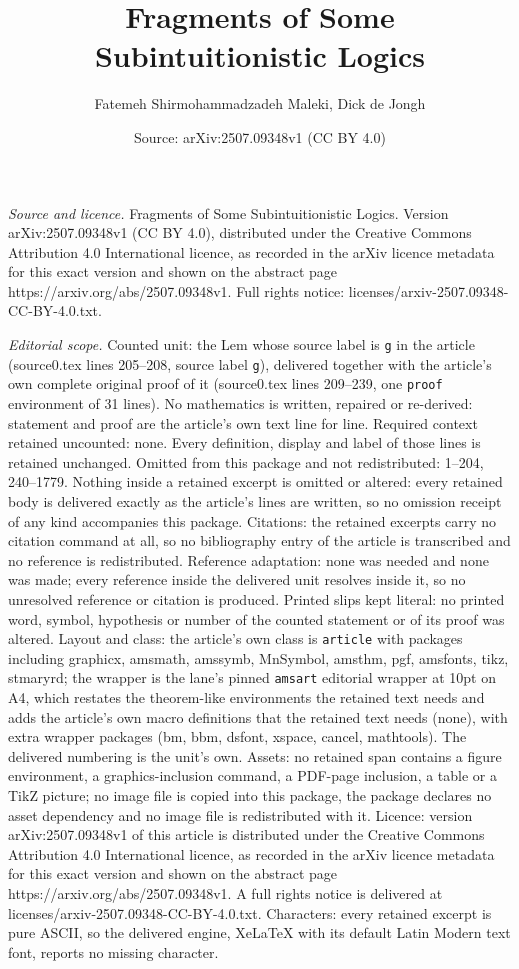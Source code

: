 \documentclass[10pt,a4paper]{amsart}
\title[Fragments of Some Subintuitionistic Logics]{Fragments of Some Subintuitionistic Logics}
\author{Fatemeh Shirmohammadzadeh Maleki, Dick de Jongh}
\date{Source: arXiv:2507.09348v1 (CC BY 4.0)}
\begin{document}
\maketitle

\noindent\emph{Source and licence.} Fragments of Some Subintuitionistic Logics. Version arXiv:2507.09348v1 (CC BY 4.0), distributed under the Creative Commons Attribution 4.0 International licence, as recorded in the arXiv licence metadata for this exact version and shown on the abstract page https://arxiv.org/abs/2507.09348v1. Full rights notice: licenses/arxiv-2507.09348-CC-BY-4.0.txt.\par\smallskip

\noindent\textit{Editorial scope.} Counted unit: the Lem whose source label is \texttt{g} in the article (source0.tex lines 205--208, source label \texttt{g}), delivered together with the article's own complete original proof of it (source0.tex lines 209--239, one \texttt{proof} environment of 31 lines). No mathematics is written, repaired or re-derived: statement and proof are the article's own text line for line. Required context retained uncounted: none. Every definition, display and label of those lines is retained unchanged. Omitted from this package and not redistributed: 1--204, 240--1779. Nothing inside a retained excerpt is omitted or altered: every retained body is delivered exactly as the article's lines are written, so no omission receipt of any kind accompanies this package. Citations: the retained excerpts carry no citation command at all, so no bibliography entry of the article is transcribed and no reference is redistributed. Reference adaptation: none was needed and none was made; every reference inside the delivered unit resolves inside it, so no unresolved reference or citation is produced. Printed slips kept literal: no printed word, symbol, hypothesis or number of the counted statement or of its proof was altered. Layout and class: the article's own class is \texttt{article} with packages including graphicx, amsmath, amssymb, MnSymbol, amsthm, pgf, amsfonts, tikz, stmaryrd; the wrapper is the lane's pinned \texttt{amsart} editorial wrapper at 10pt on A4, which restates the theorem-like environments the retained text needs and adds the article's own macro definitions that the retained text needs (none), with extra wrapper packages (bm, bbm, dsfont, xspace, cancel, mathtools). The delivered numbering is the unit's own. Assets: no retained span contains a figure environment, a graphics-inclusion command, a PDF-page inclusion, a table or a TikZ picture; no image file is copied into this package, the package declares no asset dependency and no image file is redistributed with it. Licence: version arXiv:2507.09348v1 of this article is distributed under the Creative Commons Attribution 4.0 International licence, as recorded in the arXiv licence metadata for this exact version and shown on the abstract page https://arxiv.org/abs/2507.09348v1. A full rights notice is delivered at licenses/arxiv-2507.09348-CC-BY-4.0.txt. Characters: every retained excerpt is pure ASCII, so the delivered engine, XeLaTeX with its default Latin Modern text font, reports no missing character.
\end{document}

